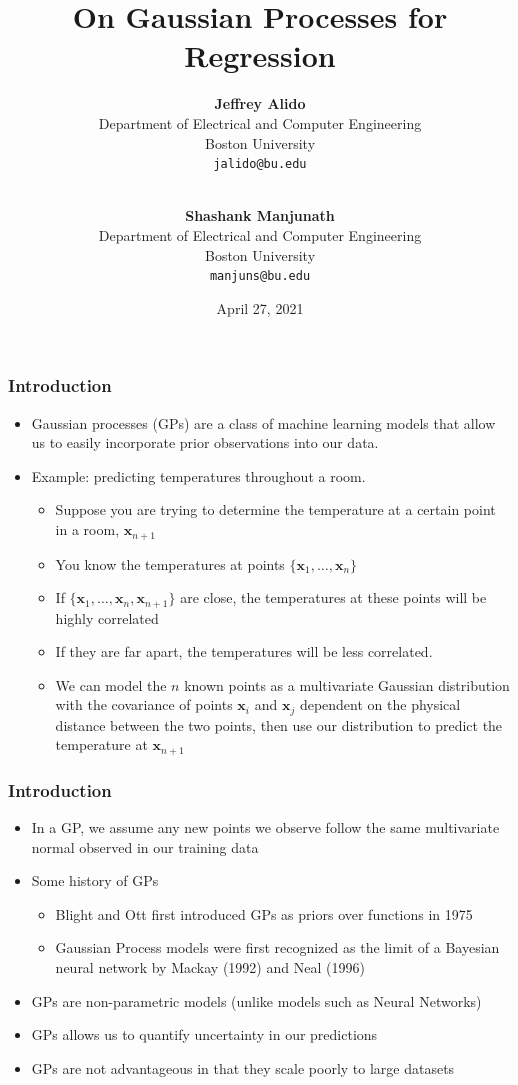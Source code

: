 \documentclass[pdf]{beamer}
\title{On Gaussian Processes for Regression}
\author{
  \textbf{Jeffrey Alido} \\
  Department of Electrical and Computer Engineering \\
  Boston University \\
  \texttt{jalido@bu.edu} \\
  \and \\
  \textbf{Shashank Manjunath} \\
  Department of Electrical and Computer Engineering \\
  Boston University \\
  \texttt{manjuns@bu.edu}
}
\date{April 27, 2021}
\newcommand{\bx}{\boldsymbol{x}}
\begin{document}
\begin{frame}
  \titlepage
\end{frame}

\begin{frame}
  \frametitle{Introduction}

  \begin{itemize}
    \item Gaussian processes (GPs) are a class of machine learning models that allow us to easily incorporate prior
      observations into our data. 
    \item Example: predicting temperatures throughout a room.
    \begin{itemize}
      \item Suppose you are trying to determine the temperature at a certain point in a room, $\bx_{n+1}$
      \item You know the temperatures at points $\{\bx_1, \hdots, \bx_n\}$
      \item If $\{\bx_1, \hdots, \bx_n, \bx_{n+1}\}$ are close, the temperatures at these points will be highly
        correlated
      \item If they are far apart, the temperatures will be less correlated.
      \item We can model the $n$ known points as a multivariate Gaussian distribution with the covariance of points
        $\bx_i$ and $\bx_j$ dependent on the physical distance between the two points, then use our distribution to
        predict the temperature at $\bx_{n+1}$
    \end{itemize}
  \end{itemize}
\end{frame}

\begin{frame}
  \frametitle{Introduction}
  \begin{itemize}
    \item In a GP, we assume any new points we observe follow the same multivariate normal observed in our training data
    \item Some history of GPs 
    	\cite{rasmussen_gaussian_2006}
    \begin{itemize}
      \item Blight and Ott first introduced GPs as priors over functions in 1975\cite{kuss_gaussian_2006}
      \item Gaussian Process models were first recognized as the limit of a Bayesian neural network by Mackay (1992) and
        Neal (1996)\cite{kuss_gaussian_2006}
    \end{itemize}
    \item GPs are non-parametric models (unlike models such as Neural Networks)\cite{bishop_pattern_2006}
    \item GPs allows us to quantify uncertainty in our predictions
    \item GPs are not advantageous in that they scale poorly to large datasets
  \end{itemize}
\end{frame}
\end{document}
